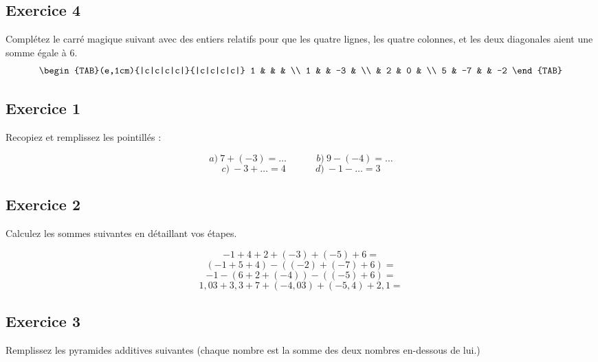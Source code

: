 \documentclass[14pt]{extreport}
\theoremstyle{plain}
\begin{document}
\subsection*{Exercice 4} %
Complétez le carré magique suivant avec des entiers relatifs pour que les quatre lignes, les quatre colonnes, 
et les deux diagonales aient une somme égale à $6$. 
\[
\begin{TAB}(e,1cm){|c|c|c|c|}{|c|c|c|c|}
    1 & & &  \\
    1 &  & -3 &  \\
      & 2 & 0 & \\
    5  & -7 &  & -2
\end{TAB}
\]


 
\newpage
\subsection*{Exercice 1}  %

Recopiez et remplissez les pointillés :

\[ a)\ 7 + (-3) =\ldots \ \ \ \ \ \ \ \ \ \ \ \ \ \ 
 b)\ 9 - (-4) = \ldots \]
\[ c)\ -3 + \ldots = 4  \ \ \ \ \ \ \ \ \ \ \ \ \ \  
d)\ -1 - \ldots = 3\]
\subsection*{Exercice 2} %

Calculez les sommes suivantes en détaillant vos étapes. 

\[ -1  + 4 + 2 + (-3) + (-5) + 6 =\]
\[ (-1  + 5 + 4) - ((-2) + (-7) + 6 ) =\]
\[ -1  - ( 6 + 2 + (-4) ) - ((-5) + 6) =\]
\[ 1,03  + 3,3 + 7 + (-4,03)   + (-5,4) + 2,1 =  \]



\subsection*{Exercice 3}

Remplissez les pyramides additives suivantes (chaque nombre est la somme des deux nombres en-dessous de lui.)
\end{document}
